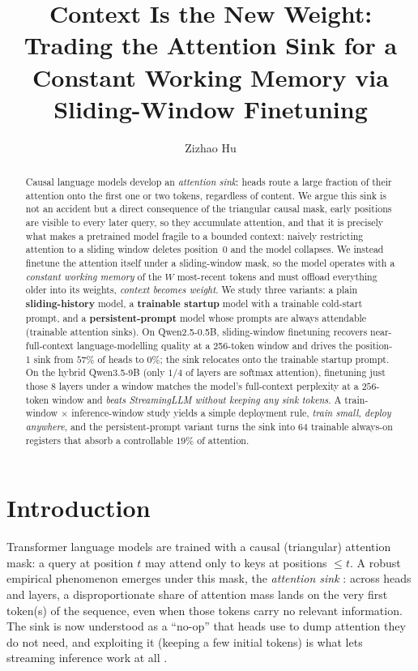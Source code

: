 \documentclass[letterpaper]{article} %
\title{Context Is the New Weight: Trading the Attention Sink for a Constant Working Memory via Sliding-Window Finetuning}
\author{Zizhao Hu}
\begin{document}
\maketitle

\begin{abstract}
Causal language models develop an \emph{attention sink}: heads route a large fraction of their attention onto the first one or two tokens, regardless of content. We argue this sink is not an accident but a direct consequence of the triangular causal mask, early positions are visible to every later query, so they accumulate attention, and that it is precisely what makes a pretrained model fragile to a bounded context: naively restricting attention to a sliding window deletes position~0 and the model collapses. We instead finetune the attention itself under a sliding-window mask, so the model operates with a \emph{constant working memory} of the $W$ most-recent tokens and must offload everything older into its weights, \emph{context becomes weight}. We study three variants: a plain \textbf{sliding-history} model, a \textbf{trainable startup} model with a trainable cold-start prompt, and a \textbf{persistent-prompt} model whose prompts are always attendable (trainable attention sinks). On Qwen2.5-0.5B, sliding-window finetuning recovers near-full-context language-modelling quality at a 256-token window and drives the position-1 sink from $57\%$ of heads to $0\%$; the sink relocates onto the trainable startup prompt. On the hybrid Qwen3.5-9B (only $1/4$ of layers are softmax attention), finetuning just those $8$ layers under a window matches the model's full-context perplexity at a $256$-token window and \emph{beats StreamingLLM without keeping any sink tokens}. A train-window $\times$ inference-window study yields a simple deployment rule, \emph{train small, deploy anywhere}, and the persistent-prompt variant turns the sink into $64$ trainable always-on registers that absorb a controllable $19\%$ of attention.
\end{abstract}

\section{Introduction}
Transformer language models are trained with a causal (triangular) attention mask: a query at position $t$ may attend only to keys at positions $\le t$. A robust empirical phenomenon emerges under this mask, the \emph{attention sink} \citep{xiao2024streamingllm}: across heads and layers, a disproportionate share of attention mass lands on the very first token(s) of the sequence, even when those tokens carry no relevant information. The sink is now understood as a ``no-op'' that heads use to dump attention they do not need, and exploiting it (keeping a few initial tokens) is what lets streaming inference work at all \citep{xiao2024streamingllm,han2024lminfinite}.
\end{document}

